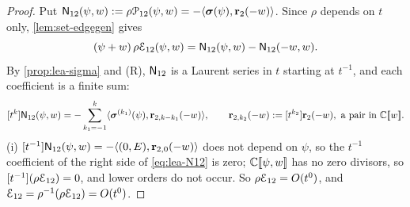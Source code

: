 \begin{proof}
Put $\mathsf{N}_{12}(\psi,w) := \rho\mathcal{P}_{12}(\psi,w) = -\langle\boldsymbol{\sigma}(\psi),\mathbf{r}_2(-w)\rangle$. Since $\rho$ depends on $t$ only, \cref{lem:set-edgegen} gives
\begin{equation}
\label{eq:lea-N12}
(\psi+w)\,\rho\mathcal{E}_{12}(\psi,w) = \mathsf{N}_{12}(\psi,w) - \mathsf{N}_{12}(-w,w).
\end{equation}
By \cref{prop:lea-sigma} and (R), $\mathsf{N}_{12}$ is a Laurent series in $t$ starting at $t^{-1}$, and each coefficient is a finite sum:
\begin{equation}
\label{eq:lea-N12coef}
[t^k]\mathsf{N}_{12}(\psi,w) = -\sum_{k_1=-1}^{k}\langle\boldsymbol{\sigma}^{(k_1)}(\psi),\mathbf{r}_{2,k-k_1}(-w)\rangle,\qquad \mathbf{r}_{2,k_2}(-w) := [t^{k_2}]\mathbf{r}_2(-w),\ \text{a pair in }\mathbb{C}[\![ w ]\!].
\end{equation}
(i) $[t^{-1}]\mathsf{N}_{12}(\psi,w) = -\langle(0,E),\mathbf{r}_{2,0}(-w)\rangle$ does not depend on $\psi$, so the $t^{-1}$ coefficient of the right side of \eqref{eq:lea-N12} is zero; $\mathbb{C}[\![ \psi,w ]\!]$ has no zero divisors, so $[t^{-1}](\rho\mathcal{E}_{12}) = 0$, and lower orders do not occur. So $\rho\mathcal{E}_{12} = O(t^0)$, and $\mathcal{E}_{12} = \rho^{-1}(\rho\mathcal{E}_{12}) = O(t^0)$.


\end{proof}
